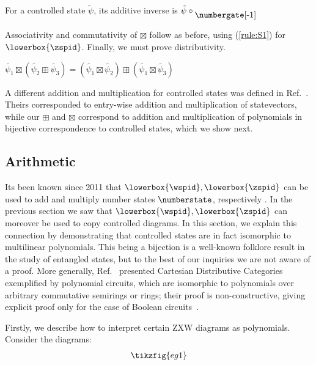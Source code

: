 \begin{lemma}\label{lem:csaddinv}
    For a controlled state $\tilde{\psi}$, its additive inverse is $\tilde{\psi} \circ \raisebox{-5pt}{\numbergate[-1]}$
\end{lemma}


Associativity and commutativity of $\boxtimes$ follow as before, using (\ref{rule:S1}) for $\lowerbox{\zspid}$. Finally, we must prove distributivity.


\begin{lemma}\label{lem:csdist}
    $\tilde{\psi_1} \boxtimes (\tilde{\psi_2} \boxplus \tilde{\psi_3}) = (\tilde{\psi_1} \boxtimes \tilde{\psi_2}) \boxplus (\tilde{\psi_1} \boxtimes \tilde{\psi_3})$
\end{lemma}

\begin{remark}
    A different addition and multiplication for controlled states was defined in Ref.~\cite{jeandel2018zxconstructive}. Theirs corresponded to entry-wise addition and multiplication of statevectors, while our $\boxplus$ and $\boxtimes$ correspond to addition and multiplication of polynomials in bijective correspondence to controlled states, which we show next.
\end{remark}




\subsection{Arithmetic}

Its been known since 2011 that $\lowerbox{\wspid}, \lowerbox{\zspid}$ can be used to add and multiply number states $\numberstate$, respectively \cite{coecke2011ghz}. In the previous section we saw that $\lowerbox{\wspid}, \lowerbox{\zspid}$ can moreover be used to copy controlled diagrams. In this section, we explain this connection by demonstrating that controlled states are in fact isomorphic to multilinear polynomials. This being a bijection is a well-known folklore result in the study of entangled states, but to the best of our inquiries we are not aware of a proof. More generally, Ref.~\cite{wilson2023diffpolycirc} presented Cartesian Distributive Categories exemplified by polynomial circuits, which are isomorphic to polynomials over arbitrary commutative semirings or rings; their proof is non-constructive, giving explicit proof only for the case of Boolean circuits~\cite{wilson2021revderbool}.

Firstly, we describe how to interpret certain ZXW diagrams as polynomials. Consider the diagrams:
\begin{equation}
    \tikzfig{eg1}
\end{equation}

